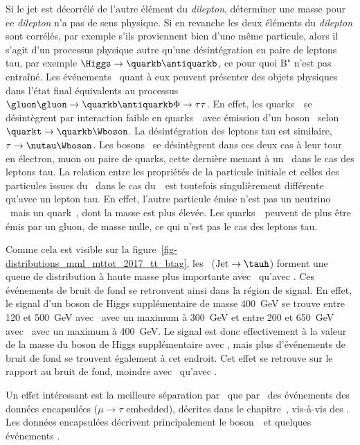 Si le jet est décorrélé de l'autre élément du \emph{dilepton},
déterminer une masse pour ce \emph{dilepton} n'a pas de sens physique.
Si en revanche les deux éléments du \emph{dilepton} sont corrélés,
par exemple s'ils proviennent bien d'une même particule,
alors il s'agit d'un processus physique autre qu'une désintégration en paire de leptons tau,
par exemple $\Higgs\to\quarkb\antiquarkb$,
ce pour quoi B" n'est pas entraîné.
Les événements \ttbar\ quant à eux peuvent présenter des objets physiques dans l'état final équivalents
au processus $\gluon\gluon\to\quarkb\antiquarkb\Phi\to\tau\tau$.
En effet,
les quarks~\quarkt\
se désintègrent par interaction faible en quarks~\quarkb\
avec émission d'un boson \Wboson\
selon
$\quarkt\to\quarkb\Wboson$.
La désintégration des leptons tau est similaire,
$\tau\to\nutau\Wboson$.
Les bosons \Wboson\ se désintègrent dans ces deux cas à leur tour en électron, muon ou paire de quarks,
cette dernière menant à un \tauh\ dans le cas des leptons tau.
La relation entre les propriétés
de la particule initiale
et celles
des particules issues du \Wboson\ 
dans le cas du~\quarkt\
est toutefois
singulièrement différente
qu'avec un lepton tau.
En effet, l'autre particule émise n'est pas un neutrino \nutau\
mais un quark~\quarkb,
dont la masse est plus élevée.
Les quarks~\quarkt\ peuvent de plus être émis par un gluon, de masse nulle, ce qui n'est pas le cas des leptons tau.
\par
Comme cela est visible sur la figure~\ref{fig-distributions_mml_mttot_2017_tt_btag},
les \ftauhs\ ($\text{Jet}\to\tauh$) forment une queue de distribution à haute masse plus importante avec \mml\ qu'avec \mTtot.
Ces événements de bruit de fond se retrouvent ainsi dans la région de signal.
En effet, le signal d'un boson de Higgs supplémentaire de masse \SI{400}{\GeV} se trouve
entre \num{120} et \SI{500}{\GeV} avec \mTtot\
avec un maximum à \SI{300}{\GeV}
et
entre \num{200} et \SI{650}{\GeV} avec \mml\
avec un maximum à \SI{400}{\GeV}.
Le signal est donc effectivement à la valeur de la masse du boson de Higgs supplémentaire avec \mml,
mais plus d'événements de bruit de fond se trouvent également à cet endroit.
Cet effet se retrouve sur le rapport au bruit de fond, moindre avec \mml\ qu'avec \mTtot.
\par
Un effet intéressant est la meilleure séparation par \mml\ que par \mTtot\ des événements
des données encapsulées ($\mu\to\tau$ embedded), décrites dans le chapitre~,
vis-à-vis des \ftauhs.
Les données encapsulées décrivent principalement le boson~\Zboson\ et quelques événements \ttbar.
